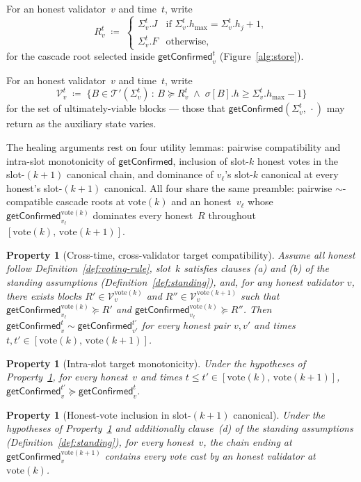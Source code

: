 \documentclass{article}
\newcommand{\T}[0]{\ensuremath{\mathcal{T}}}
\newcommand{\V}[0]{\ensuremath{\mathcal{V}}}
\newcommand{\hmax}{\ensuremath{h_{\max}}\xspace}
\newcommand{\uviable}{ultimately-viable\xspace}
\newcommand{\vote}{\ensuremath{\mathrm{vote}}}
\newcommand{\getConfirmed}{\textsf{getConfirmed}\xspace}
\theoremstyle{plain}
\newtheorem{property}[theorem]{Property}
\theoremstyle{definition}
\theoremstyle{remark}
\begin{document}
For an honest validator~$v$ and time~$t$, write
\[
  R_v^t \;\coloneqq\; \begin{cases}\Sigma_v^t.J & \text{if } \Sigma_v^t.\hmax = \Sigma_v^t.h_j + 1, \\ \Sigma_v^t.F & \text{otherwise,}\end{cases}
\]
for the cascade root selected inside $\getConfirmed_v^t$ (Figure~\ref{alg:store}).

For an honest validator~$v$ and time~$t$, write
\[
  \V_v^t \;\coloneqq\; \{B \in \T'(\Sigma_v^t) \,:\, B \succeq R_v^t \;\wedge\; \sigma[B].h \geq \Sigma_v^t.\hmax-1\}
\]
for the set of \uviable{} blocks --- those that $\getConfirmed(\Sigma_v^t,\, \cdot)$ may return as the auxiliary state varies.

The healing arguments rest on four utility lemmas: pairwise compatibility and intra-slot monotonicity of $\getConfirmed$, inclusion of slot-$k$ honest votes in the slot-$(k{+}1)$ canonical chain, and dominance of $v_\ell$'s slot-$k$ canonical at every honest's slot-$(k{+}1)$ canonical.
All four share the same preamble: pairwise $\sim$-compatible cascade roots at $\vote(k)$ and an honest~$v_\ell$ whose $\getConfirmed_{v_\ell}^{\vote(k)}$ dominates every honest~$R$ throughout $[\vote(k),\, \vote(k{+}1)]$.

\begin{property}[Cross-time, cross-validator target compatibility]\label{prop:getConfirmed-compat}
Assume all honest follow Definition~\ref{def:voting-rule}, slot~$k$ satisfies clauses (a) and (b) of the standing assumptions (Definition~\ref{def:standing}), and, for any honest validator $v$, there exists blocks $R' \in \V_v^{\vote(k)}$ and $R'' \in \V_v^{\vote(k+1)}$ such that $\getConfirmed_{v_\ell}^{\vote(k)} \succeq R'$ and $\getConfirmed_{v_\ell}^{\vote(k)} \succeq R''$.
Then $\getConfirmed_v^t \sim \getConfirmed_{v'}^{t'}$ for every honest pair $v, v'$ and times $t, t' \in [\vote(k),\, \vote(k{+}1)]$.
\end{property}

\begin{property}[Intra-slot target monotonicity]\label{prop:getConfirmed-monotone}
Under the hypotheses of Property~\ref{prop:getConfirmed-compat}, for every honest~$v$ and times $t \leq t' \in [\vote(k),\, \vote(k{+}1)]$, $\getConfirmed_v^{t'} \succeq \getConfirmed_v^t$.
\end{property}

\begin{property}[Honest-vote inclusion in slot-$(k{+}1)$ canonical]\label{prop:vote-inclusion}
Under the hypotheses of Property~\ref{prop:getConfirmed-compat} and additionally clause~(d) of the standing assumptions (Definition~\ref{def:standing}), for every honest~$v$, the chain ending at $\getConfirmed_v^{\vote(k+1)}$ contains every vote cast by an honest validator at~$\vote(k)$.
\end{property}
\end{document}
